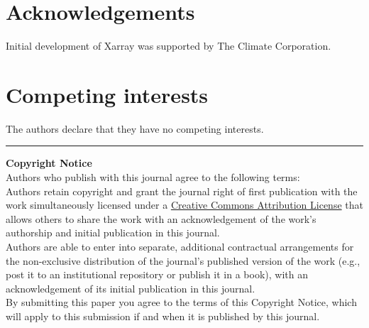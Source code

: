 \documentclass{jors}
\begin{document}
\section*{Acknowledgements}

Initial development of Xarray was supported by The Climate Corporation.

\section*{Competing interests}

The authors declare that they have no competing interests.



\vspace{2cm}

\rule{\textwidth}{1pt}

{ \bf Copyright Notice} \\
Authors who publish with this journal agree to the following terms: \\

Authors retain copyright and grant the journal right of first publication with the work simultaneously licensed under a  \href{http://creativecommons.org/licenses/by/3.0/}{Creative Commons Attribution License} that allows others to share the work with an acknowledgement of the work's authorship and initial publication in this journal. \\

Authors are able to enter into separate, additional contractual arrangements for the non-exclusive distribution of the journal's published version of the work (e.g., post it to an institutional repository or publish it in a book), with an acknowledgement of its initial publication in this journal. \\

By submitting this paper you agree to the terms of this Copyright Notice, which will apply to this submission if and when it is published by this journal.
\end{document}
